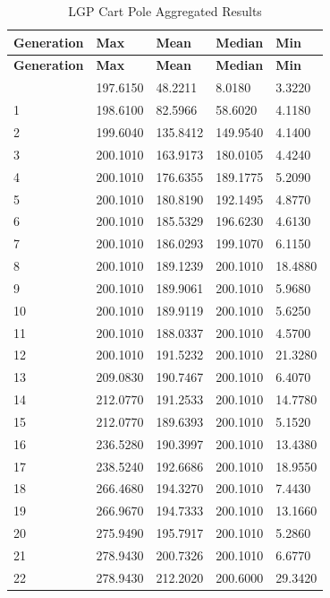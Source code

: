 \begin{longtable}{|l|l|l|l|l|}
\caption{LGP Cart Pole Aggregated Results}\label{tab:cart-pole-lgp}\\\hline
\textbf{Generation} & \textbf{Max} & \textbf{Mean} & \textbf{Median} & \textbf{Min} \\\hline
\endfirsthead
\hline
\textbf{Generation} & \textbf{Max} & \textbf{Mean} & \textbf{Median} & \textbf{Min} \\\hline
\endhead
\hline
\endfoot
0 & 197.6150 & 48.2211 & 8.0180 & 3.3220 \\\hline
1 & 198.6100 & 82.5966 & 58.6020 & 4.1180 \\\hline
2 & 199.6040 & 135.8412 & 149.9540 & 4.1400 \\\hline
3 & 200.1010 & 163.9173 & 180.0105 & 4.4240 \\\hline
4 & 200.1010 & 176.6355 & 189.1775 & 5.2090 \\\hline
5 & 200.1010 & 180.8190 & 192.1495 & 4.8770 \\\hline
6 & 200.1010 & 185.5329 & 196.6230 & 4.6130 \\\hline
7 & 200.1010 & 186.0293 & 199.1070 & 6.1150 \\\hline
8 & 200.1010 & 189.1239 & 200.1010 & 18.4880 \\\hline
9 & 200.1010 & 189.9061 & 200.1010 & 5.9680 \\\hline
10 & 200.1010 & 189.9119 & 200.1010 & 5.6250 \\\hline
11 & 200.1010 & 188.0337 & 200.1010 & 4.5700 \\\hline
12 & 200.1010 & 191.5232 & 200.1010 & 21.3280 \\\hline
13 & 209.0830 & 190.7467 & 200.1010 & 6.4070 \\\hline
14 & 212.0770 & 191.2533 & 200.1010 & 14.7780 \\\hline
15 & 212.0770 & 189.6393 & 200.1010 & 5.1520 \\\hline
16 & 236.5280 & 190.3997 & 200.1010 & 13.4380 \\\hline
17 & 238.5240 & 192.6686 & 200.1010 & 18.9550 \\\hline
18 & 266.4680 & 194.3270 & 200.1010 & 7.4430 \\\hline
19 & 266.9670 & 194.7333 & 200.1010 & 13.1660 \\\hline
20 & 275.9490 & 195.7917 & 200.1010 & 5.2860 \\\hline
21 & 278.9430 & 200.7326 & 200.1010 & 6.6770 \\\hline
22 & 278.9430 & 212.2020 & 200.6000 & 29.3420 \\\hline

\end{longtable}
